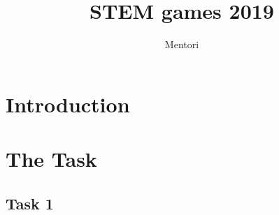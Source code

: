 \documentclass{article}
\title{STEM games 2019}
\author{Mentori}
\begin{document}
	
\maketitle



\section{Introduction}


\section{The Task}

\subsection{Task 1}


	
	
	
\end{document}
